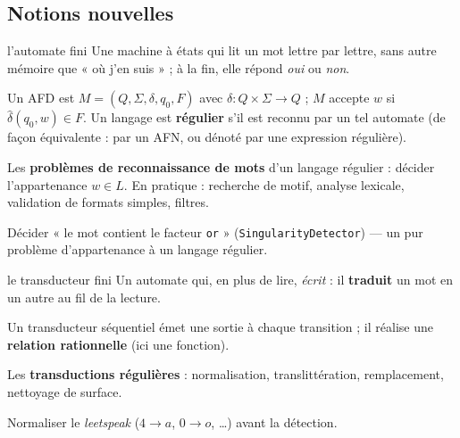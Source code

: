 \documentclass[11pt,a4paper]{scrartcl}
\begin{document}
\subsection{Notions nouvelles}
\begin{objetformel}{l'automate fini}
 Une machine à états qui lit un mot lettre par lettre, sans autre
mémoire que « où j'en suis » ; à la fin, elle répond \emph{oui} ou \emph{non}.

 Un AFD est $M=(Q,\Sigma,\delta,q_0,F)$ avec
$\delta:Q\times\Sigma\to Q$ ; $M$ accepte $w$ si $\hat\delta(q_0,w)\in F$. Un langage est
\textbf{régulier} s'il est reconnu par un tel automate (de façon équivalente : par un AFN,
ou dénoté par une expression régulière).

 Les \textbf{problèmes de reconnaissance de mots} d'un langage
régulier : décider l'appartenance $w\in L$. En pratique : recherche de motif, analyse
lexicale, validation de formats simples, filtres.

 Décider « le mot contient le facteur \texttt{or} »
(\texttt{SingularityDetector}) — un pur problème d'appartenance à un langage régulier.
\end{objetformel}

\begin{objetformel}{le transducteur fini}
 Un automate qui, en plus de lire, \emph{écrit} : il \textbf{traduit} un
mot en un autre au fil de la lecture.

 Un transducteur séquentiel émet une sortie à chaque transition ;
il réalise une \textbf{relation rationnelle} (ici une fonction).

 Les \textbf{transductions régulières} : normalisation,
translittération, remplacement, nettoyage de surface.

 Normaliser le \emph{leetspeak} ($4\!\to\!a$, $0\!\to\!o$, \dots)
avant la détection.
\end{objetformel}
\end{document}
